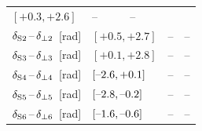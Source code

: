 \begin{table}[htbp]
\begin{tabular}{lllcc}
{                                                        %
                                                        $[\text{+0.3},   \text{+2.6}]$}    &  --  &  --  \\
    $\delSperp[\text{2}]$~[rad]  &   \multicolumn{2}{l}{%
                                                        $[\text{+0.5},   \text{+2.7}]$}    &  --  &  --  \\
    $\delSperp[\text{3}]$~[rad]  &   \multicolumn{2}{l}{%
                                                        $[\text{+0.1},   \text{+2.8}]$}    &  --  &  --  \\
    $\delSperp[\text{4}]$~[rad]  &   \multicolumn{2}{l}{%
                                                        $[\text{\tm2.6}, \text{+0.1}]$}    &  --  &  --  \\
    $\delSperp[\text{5}]$~[rad]  &   \multicolumn{2}{l}{%
                                                        $[\text{\tm2.8}, \text{\tm0.2}]$}  &  --  &  --  \\
    $\delSperp[\text{6}]$~[rad]  &   \multicolumn{2}{l}{%
                                                        $[\text{\tm1.6}, \text{\tm0.6}]$}  &  --  &  --  \\
    \hline
  \end{tabular}
\end{table}

